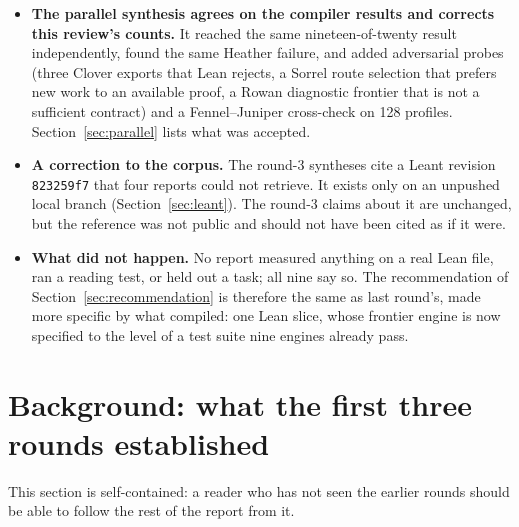 \documentclass[11pt,a4paper]{article}
\newcommand{\code}[1]{\nolinkurl{#1}}
\theoremstyle{definition}
\theoremstyle{plain}
\begin{document}
\begin{itemize}
\item \textbf{The parallel synthesis agrees on the compiler results and corrects this review's counts.} It reached the same nineteen-of-twenty result independently, found the same Heather failure, and added adversarial probes (three Clover exports that Lean rejects, a Sorrel route selection that prefers new work to an available proof, a Rowan diagnostic frontier that is not a sufficient contract) and a Fennel--Juniper cross-check on 128 profiles. Section~\ref{sec:parallel} lists what was accepted.
\item \textbf{A correction to the corpus.} The round-3 syntheses cite a Leant revision \code{823259f7} that four reports could not retrieve. It exists only on an unpushed local branch (Section~\ref{sec:leant}). The round-3 claims about it are unchanged, but the reference was not public and should not have been cited as if it were.
\item \textbf{What did not happen.} No report measured anything on a real Lean file, ran a reading test, or held out a task; all nine say so. The recommendation of Section~\ref{sec:recommendation} is therefore the same as last round's, made more specific by what compiled: one Lean slice, whose frontier engine is now specified to the level of a test suite nine engines already pass.
\end{itemize}

\section{Background: what the first three rounds established}\label{sec:background}
This section is self-contained: a reader who has not seen the earlier rounds should be able to follow the rest of the report from it.
\end{document}

